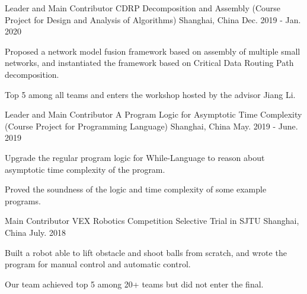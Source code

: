 

\begin{cventries}

  \cventry
    {Leader and Main Contributor} %
    {CDRP Decomposition and Assembly (Course Project for Design and Analysis of Algorithms)} %
    {Shanghai, China} %
    {Dec. 2019 - Jan. 2020} %
    {
      \begin{cvitems} %
        \item {Proposed a network model fusion framework based on assembly of multiple small networks, and instantiated the framework based on Critical Data Routing Path decomposition.}
        \item {Top 5 among all teams and enters the workshop hosted by the advisor Jiang Li.}
      \end{cvitems}
    }

  \cventry
    {Leader and Main Contributor} %
    {A Program Logic for Asymptotic Time Complexity (Course Project for Programming Language)} %
    {Shanghai, China} %
    {May. 2019 - June. 2019} %
    {
      \begin{cvitems} %
        \item {Upgrade the regular program logic for While-Language to reason about asymptotic time complexity of the program.}
        \item {Proved the soundness of the logic and time complexity of some example programs.}
      \end{cvitems}
    }

  \cventry
  {Main Contributor} %
  {VEX Robotics Competition Selective Trial in SJTU} %
  {Shanghai, China} %
  {July. 2018} %
  {
    \begin{cvitems} %
      \item {Built a robot able to lift obstacle and shoot balls from scratch, and wrote the program for manual control and automatic control.}
      \item {Our team achieved top 5 among 20+ teams but did not enter the final.}
    \end{cvitems}
  }

\end{cventries}

